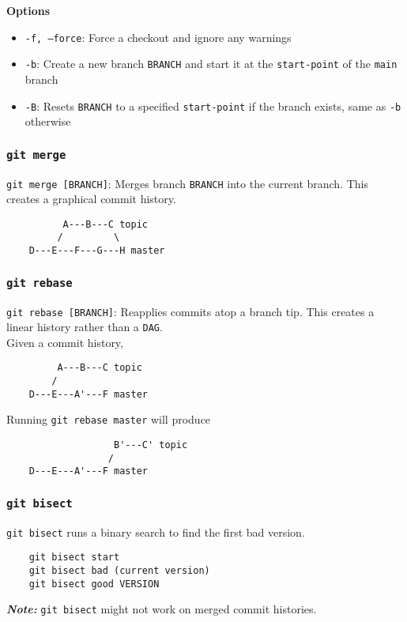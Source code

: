\documentclass[13pt]{article}
\begin{document}
\textbf{Options}
\begin{itemize}[label=]
\item \texttt{-f, --force}: Force a checkout and ignore any warnings
\item \texttt{-b}: Create a new branch \texttt{BRANCH} and start it at the \texttt{start-point} of the \texttt{main} branch
\item \texttt{-B}: Resets \texttt{BRANCH} to a specified \texttt{start-point} if the branch exists, same as \texttt{-b} otherwise
\end{itemize}

\subsubsection*{\texttt{git merge}}
\texttt{git merge [BRANCH]}: Merges branch \texttt{BRANCH} into the current branch. This creates a graphical commit history.
\begin{verbatim}
          A---B---C topic
         /         \
    D---E---F---G---H master
\end{verbatim}


\subsubsection*{\texttt{git rebase}}
\texttt{git rebase [BRANCH]}: Reapplies commits atop a branch tip. This creates a linear history rather than a \texttt{DAG}. \\
Given a commit history,
\begin{verbatim}
         A---B---C topic
        /
    D---E---A'---F master
\end{verbatim}
Running \texttt{git rebase master} will produce
\begin{verbatim}
                   B'---C' topic
                  /
    D---E---A'---F master
\end{verbatim}

\subsubsection*{\texttt{git bisect}}
\texttt{git bisect} runs a binary search to find the first bad version.
\begin{verbatim}
    git bisect start
    git bisect bad (current version)
    git bisect good VERSION
\end{verbatim}
\textit{\textbf{Note:}} \texttt{git bisect} might not work on merged commit histories.
\end{document}
